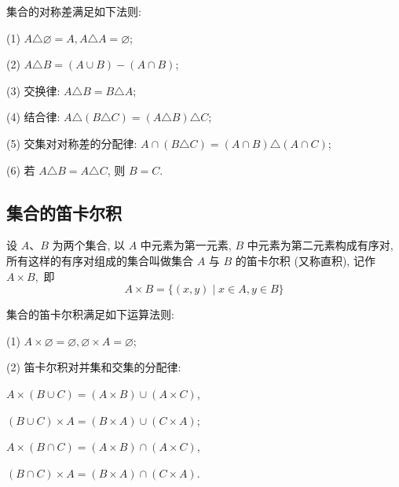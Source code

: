 集合的对称差满足如下法则:

(1) $A \triangle \varnothing=A, A \triangle A=\varnothing$;

(2) $A \triangle B=(A \cup B)-(A \cap B)$;

(3) 交换律: $A \triangle B=B \triangle A$;

(4) 结合律: $A \triangle(B \triangle C)=(A \triangle B) \triangle C$;

(5) 交集对对称差的分配律: $A \cap(B \triangle C)=(A \cap B) \triangle(A \cap C)$;

(6) 若 $A \triangle B=A \triangle C$, 则 $B=C$.

\subsection{集合的笛卡尔积}
\begin{definition}
	设 $A 、 B$ 为两个集合, 以 $A$ 中元素为第一元素, $B$ 中元素为第二元素构成有序对, 所有这样的有序对组成的集合叫做集合 $A$ 与 $B$ 的笛卡尔积 (又称直积), 记作 $A \times B , $ 即
	$$
		A \times B=\{(x, y) \mid x \in A, y \in B\}
	$$
\end{definition}
集合的笛卡尔积满足如下运算法则:

(1) $A \times \varnothing=\varnothing, \varnothing \times A=\varnothing$;

(2) 笛卡尔积对并集和交集的分配律:

$A \times(B \cup C)=(A \times B) \cup(A \times C)$,

$(B \cup C) \times A=(B \times A) \cup(C \times A)$;

$A \times(B \cap C)=(A \times B) \cap(A \times C)$,

$(B \cap C) \times A=(B \times A) \cap(C \times A)$.

